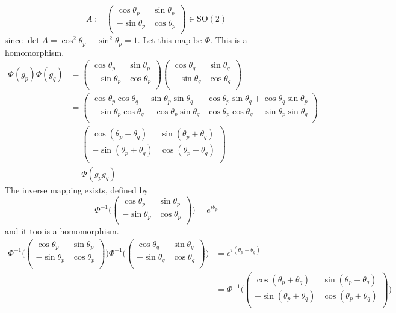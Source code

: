 \documentclass[a4paper]{article}
\begin{document}
\begin{ans}
\begin{enumerate}[label=(\roman*)]
$$A:=\begin{pmatrix}\cos\theta_p&\sin\theta_p\\-\sin\theta_p&\cos\theta_p\\\end{pmatrix}\in\text{SO}(2)$$
since $\det A=\cos^2\theta_p+\sin^2\theta_p=1$. Let this map be $\Phi$. This is a homomorphism.
\begin{align}
    \Phi(g_p)\Phi(g_q)&=\begin{pmatrix}\cos\theta_p&\sin\theta_p\\-\sin\theta_p&\cos\theta_p\\\end{pmatrix}\begin{pmatrix}\cos\theta_q&\sin\theta_q\\-\sin\theta_q&\cos\theta_q\\\end{pmatrix}\nonumber\\&=\begin{pmatrix}\cos\theta_p\cos\theta_q-\sin\theta_p\sin\theta_q&\cos\theta_p\sin\theta_q+\cos\theta_q\sin\theta_p\\-\sin\theta_p\cos\theta_q-\cos\theta_p\sin\theta_q&\cos\theta_p\cos\theta_q-\sin\theta_p\sin\theta_q\\\end{pmatrix}\nonumber\\&=\begin{pmatrix}\cos(\theta_p+\theta_q)&\sin(\theta_p+\theta_q)\\-\sin(\theta_p+\theta_q)&\cos(\theta_p+\theta_q)\\\end{pmatrix}\nonumber\\&=\Phi(g_pg_q)\nonumber
\end{align}
The inverse mapping exists, defined by
$$\Phi^{-1}\bigg(\begin{pmatrix}\cos\theta_p&\sin\theta_p\\-\sin\theta_p&\cos\theta_p\\\end{pmatrix}\bigg)=e^{i\theta_p}$$
and it too is a homomorphism.
\begin{align}
    \Phi^{-1}\bigg(\begin{pmatrix}\cos\theta_p&\sin\theta_p\\-\sin\theta_p&\cos\theta_p\\\end{pmatrix}\bigg)\Phi^{-1}\bigg(\begin{pmatrix}\cos\theta_q&\sin\theta_q\\-\sin\theta_q&\cos\theta_q\\\end{pmatrix}\bigg)&=e^{i(\theta_p+\theta_q)}\nonumber\\&=\Phi^{-1}\bigg(\begin{pmatrix}\cos(\theta_p+\theta_q)&\sin(\theta_p+\theta_q)\\-\sin(\theta_p+\theta_q)&\cos(\theta_p+\theta_q)\\\end{pmatrix}\bigg)\nonumber

\end{align}
\end{enumerate}
\end{ans}
\end{document}
